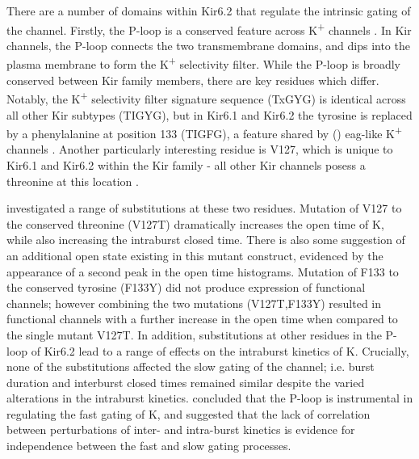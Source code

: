There are a number of domains within Kir6.2 that regulate the intrinsic gating of the channel.
Firstly, the P-loop is a conserved feature across K\textsuperscript{+} channels \cite{kuang_structure_2015}.
In Kir channels, the P-loop connects the two transmembrane domains, and dips into the plasma membrane to form the K\textsuperscript{+} selectivity filter.
While the P-loop is broadly conserved between Kir family members, there are key residues which differ.
Notably, the K\textsuperscript{+} selectivity filter signature sequence (TxGYG) is identical across all other Kir subtypes (TIGYG), but in Kir6.1 and Kir6.2 the tyrosine is replaced by a phenylalanine at position 133 (TIGFG), a feature shared by () eag-like K\textsuperscript{+} channels \cite{heginbotham_mutations_1994}.
Another particularly interesting residue is V127, which is unique to Kir6.1 and Kir6.2 within the Kir family - all other Kir channels posess a threonine at this location \cite{proks_mutations_2001}.

\textcite{proks_mutations_2001} investigated a range of substitutions at these two residues.
Mutation of V127 to the conserved threonine (V127T) dramatically increases the open time of K\ATP{}, while also increasing the intraburst closed time.
There is also some suggestion of an additional open state existing in this mutant construct, evidenced by the appearance of a second peak in the open time histograms.
Mutation of F133 to the conserved tyrosine (F133Y) did not produce expression of functional channels; however combining the two mutations (V127T,F133Y) resulted in functional channels with a further increase in the open time when compared to the single mutant V127T.
In addition, substitutions at other residues in the P-loop of Kir6.2 lead to a range of effects on the intraburst kinetics of K\ATP{}.
Crucially, none of the substitutions affected the slow gating of the channel; i.e. burst duration and interburst closed times remained similar despite the varied alterations in the intraburst kinetics.
\textcite{proks_mutations_2001} concluded that the P-loop is instrumental in regulating the fast gating of K\ATP{}, and suggested that the lack of correlation between perturbations of inter- and intra-burst kinetics is evidence for independence between the fast and slow gating processes.

